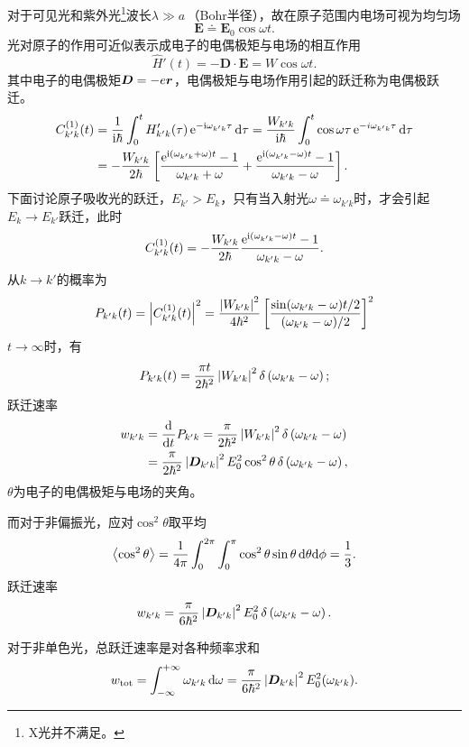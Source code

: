 对于可见光和紫外光\footnote{X光并不满足。}波长$\lambda\gg a$\,（Bohr半径），故在原子范围内电场可视为均匀场
\[
	\bm E\doteq\bm E_0\cos\omega t.
\]
光对原子的作用可近似表示成电子的电偶极矩与电场的相互作用
\[
	\hat H'(t)=-\bm D\cdot\bm E=W\cos\omega t.
\]
其中电子的电偶极矩$\bm D=-e\bm r$，电偶极矩与电场作用引起的跃迁称为电偶极跃迁。
\begin{align*}
	C_{k'k}^{(1)}(t)&=\frac1{\mathrm{i}\hbar}\int_0^tH_{k'k}'(\tau)\mathop{}\!\mathrm{e}^{-\mathrm{i}\omega_{k'k}\tau}\mathop{}\!\mathrm{d}\tau=\frac{W_{k'k}}{\mathrm{i}\hbar}\int_0^t\cos\omega\tau\mathop{}\!\mathrm{e}^{-i\omega_{k'k}\tau}\mathop{}\!\mathrm{d}\tau\\
	&=-\frac{W_{k'k}}{2\hbar}\left[\frac{\mathop{}\!\mathrm{e}^{\mathrm{i}(\omega_{k'k}+\omega)t}-1}{\omega_{k'k}+\omega}+\frac{\mathop{}\!\mathrm{e}^{\mathrm{i}(\omega_{k'k}-\omega)t}-1}{\omega_{k'k}-\omega}\right].
\end{align*}
下面讨论原子吸收光的跃迁，$E_{k'}>E_k$，只有当入射光$\omega\doteq\omega_{k'k}$时，才会引起$E_k\to E_{k'}$跃迁，此时
\begin{align*}
	C_{k'k}^{(1)}(t)=-\frac{W_{k'k}}{2\hbar}\frac{\mathop{}\!\mathrm{e}^{\mathrm{i}(\omega_{k'k}-\omega)t}-1}{\omega_{k'k}-\omega}.
\end{align*}
从$k\to k'$的概率为
\begin{align}
	P_{k'k}(t)=\left\lvert C_{k'k}^{(1)}(t)\right\rvert^2=\frac{\left\lvert W_{k'k}\right\rvert^2}{4\hbar^2}\left[\frac{\sin(\omega_{k'k}-\omega)t/2}{(\omega_{k'k}-\omega)/2}\right]^2
\end{align}
$t\to\infty$时，有 
\begin{align}
	P_{k'k}(t)=\frac{\pi t}{2\hbar^2}\left\lvert W_{k'k}\right\rvert^2\mathop{}\!\delta\left(\omega_{k'k}-\omega\right);
\end{align}
跃迁速率
\begin{align}
	w_{k'k}&=\frac{\mathrm{d}^{{}}}{\mathrm{d}{t}^{{}}}P_{k'k}=\frac\pi{2\hbar^2}\left\lvert W_{k'k}\right\rvert^2\mathop{}\!\delta\left(\omega_{k'k}-\omega\right)\\
	&=\frac\pi{2\hbar^2}\left\lvert\bm D_{k'k}\right\rvert^2E_0^2\cos^2\theta\mathop{}\!\delta\left(\omega_{k'k}-\omega\right),
\end{align}
$\theta$为电子的电偶极矩与电场的夹角。

而对于非偏振光，应对$\cos^2\theta$取平均
\[
	\left\langle \cos^2\theta\right\rangle=\frac1{4\pi}\int_0^{2\pi}\int_0^\pi\cos^2\theta\sin\theta\mathop{}\!\mathrm{d}\theta\mathrm{d}\phi=\frac13.
\]
跃迁速率 
\begin{align}
	w_{k'k}=\frac\pi{6\hbar^2}\left\lvert\bm D_{k'k}\right\rvert^2E_0^2\mathop{}\!\delta\left(\omega_{k'k}-\omega\right).
\end{align}

对于非单色光，总跃迁速率是对各种频率求和
\begin{align}
	w_\mathrm{tot}=\int_{-\infty}^{+\infty}\omega_{k'k}\mathop{}\!\mathrm{d}\omega=\frac\pi{6\hbar^2}\left\lvert\bm D_{k'k}\right\rvert^2E_0^2(\omega_{k'k}).
\end{align}

